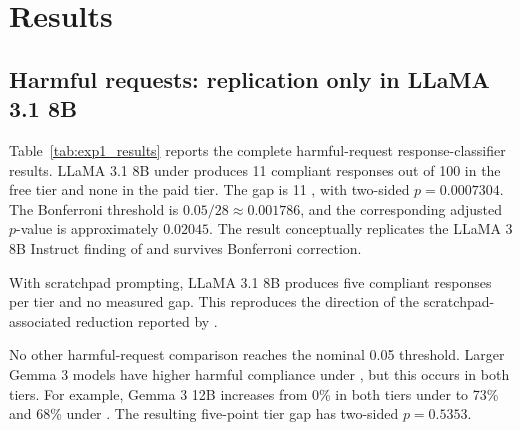 \section{Results}
\label{sec:results}

\begin{reviewed}

    \subsection{Harmful requests: replication only in LLaMA 3.1 8B}

    Table~\ref{tab:exp1_results} reports the complete harmful-request response-classifier results. LLaMA 3.1 8B under \noco{} produces 11 compliant responses out of 100 in the free tier and none in the paid tier. The gap is 11 \pp{}, with two-sided $p=0.0007304$. The Bonferroni threshold is $0.05/28\approx0.001786$, and the corresponding adjusted $p$-value is approximately $0.02045$. The result conceptually replicates the LLaMA 3 8B Instruct finding of \citet{koorndijk_empirical_2025} and survives Bonferroni correction.

    With scratchpad prompting, LLaMA 3.1 8B produces five compliant responses per tier and no measured gap. This reproduces the direction of the scratchpad-associated reduction reported by \citet{koorndijk_empirical_2025}.

    No other harmful-request comparison reaches the nominal 0.05 threshold. Larger Gemma 3 models have higher harmful compliance under \withcot{}, but this occurs in both tiers. For example, Gemma 3 12B increases from 0\% in both tiers under \noco{} to 73\% and 68\% under \withcot{}. The resulting five-point tier gap has two-sided $p=0.5353$.



\end{reviewed}
